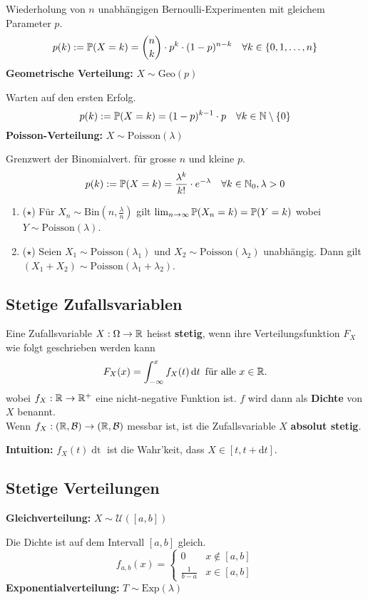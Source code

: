 Wiederholung von $n$ unabhängigen Bernoulli-Experimenten mit gleichem Parameter $p$. 
$$p(k):= \P(X = k) = \binom{n}{k} \cdot p^k \cdot (1-p)^{n-k} \quad \forall k \in \{0,1,\ldots, n\}$$
\textbf{Geometrische Verteilung:} $X \sim \text{Geo}(p)$

Warten auf den ersten Erfolg. 
$$p(k):= \P(X = k) = (1-p)^{k-1}\cdot p \quad \forall k \in \N\setminus\{0\}$$
\textbf{Poisson-Verteilung:} $X \sim \text{Poisson}(\lambda)$ 

Grenzwert der Binomialvert. für grosse $n$ und kleine $p$. 
$$p(k) := \P(X = k) = \frac{\lambda^k}{k!}\cdot e^{-\lambda} \quad \forall k \in \N_0, \lambda > 0$$
\begin{enumerate}
    \item ($\star$) Für $X_n \sim \text{Bin}(n, \frac{\lambda}{n})$ gilt $\lim_{n \to \infty}\P(X_n = k) = \P(Y = k)$ wobei $Y \sim \text{Poisson}(\lambda)$.
    \item ($\star$) Seien $X_1 \sim \text{Poisson}(\lambda_1)$ und $X_2 \sim \text{Poisson}(\lambda_2)$ unabhängig. Dann gilt $(X_1 + X_2) \sim \text{Poisson}(\lambda_1 +\lambda_2)$.
\end{enumerate}

\subsection{Stetige Zufallsvariablen}
\begin{mainbox}{}
    Eine Zufallsvariable $X: \Omega \to \R$ heisst \textbf{stetig}, wenn ihre Verteilungsfunktion $F_X$ wie folgt geschrieben werden kann
    $$F_X(x) = \int_{-\infty}^{x}f_X(t)\mathop{\text{d}t} \text{ für alle }x \in \R.$$
    wobei $f_X: \R \to \R^+$ eine nicht-negative Funktion ist. $f$ wird dann als \textbf{Dichte} von $X$ benannt.\\
    Wenn $f_X: (\R, \mathcal{B}) \to (\R, \mathcal{B})$ messbar ist, ist die Zufallsvariable $X$ \textbf{absolut stetig}.
\end{mainbox}
\textbf{Intuition:} $f_X(t)\mathop{\text{d}t}$ ist die Wahr'keit, dass $X \in [t, t + \text{d}t]$.

\subsection{Stetige Verteilungen}
\textbf{Gleichverteilung:} $X \sim \mathcal{U}([a,b])$

Die Dichte ist auf dem Intervall $[a, b]$ gleich. 
$$f_{a,b}(x) = \begin{cases}
    0 & x \notin [a,b]\\
    \frac{1}{b-a} & x \in [a,b]
\end{cases}$$
\textbf{Exponentialverteilung:} $T \sim \text{Exp}(\lambda)$

